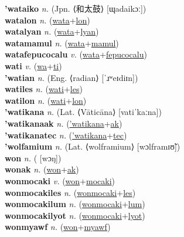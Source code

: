 \textbf{'wataiko} \textit{n.} (Jpn. ⟨和太鼓⟩ [ɰadaikɔː])
 \label{'wataiko} \\
\textbf{watalon} \textit{n.} (\hyperref[wata]{wata}+\hyperref[lon]{lon})
 \label{watalon} \\
\textbf{watalyan} \textit{n.} (\hyperref[wata]{wata}+\hyperref[lyan]{lyan})
 \label{watalyan} \\
\textbf{watamamul} \textit{n.} (\hyperref[wata]{wata}+\hyperref[mamul]{mamul})
 \label{watamamul} \\
\textbf{watafepucocalu} \textit{v.} (\hyperref[wata]{wata}+\hyperref[fepucocalu]{fepucocalu})
 \label{watafepucocalu} \\
\textbf{wati} \textit{v.} (\hyperref[wa]{wa}+\hyperref[ti]{ti})
 \label{wati} \\
\textbf{'watian} \textit{n.} (Eng. ⟨radian⟩ [ˈɹʷeɪdiɪn])
 \label{'watian} \\
\textbf{watiles} \textit{n.} (\hyperref[wati]{wati}+\hyperref[les]{les})
 \label{watiles} \\
\textbf{watilon} \textit{n.} (\hyperref[wati]{wati}+\hyperref[lon]{lon})
 \label{watilon} \\
\textbf{'watikana} \textit{n.} (Lat. ⟨Vāticāna⟩ [vatiˈkaːna])
 \label{'watikana} \\
\textbf{'watikanaak} \textit{n.} (\hyperref['watikana]{'watikana}+\hyperref[ak]{ak})
 \label{'watikanaak} \\
\textbf{'watikanatec} \textit{n.} (\hyperref['watikana]{'watikana}+\hyperref[tec]{tec})
 \label{'watikanatec} \\
\textbf{'wolfamium} \textit{n.} (Lat. ⟨wolframium⟩ [wɔlframɪʊ̃])
 \label{'wolfamium} \\
\textbf{won} \textit{n.} ( [wɔŋ])
 \label{won} \\
\textbf{wonak} \textit{n.} (\hyperref[won]{won}+\hyperref[ak]{ak})
 \label{wonak} \\
\textbf{wonmocaki} \textit{v.} (\hyperref[won]{won}+\hyperref[mocaki]{mocaki})
 \label{wonmocaki} \\
\textbf{wonmocakiles} \textit{n.} (\hyperref[wonmocaki]{wonmocaki}+\hyperref[les]{les})
 \label{wonmocakiles} \\
\textbf{wonmocakilum} \textit{n.} (\hyperref[wonmocaki]{wonmocaki}+\hyperref[lum]{lum})
 \label{wonmocakilum} \\
\textbf{wonmocakilyot} \textit{n.} (\hyperref[wonmocaki]{wonmocaki}+\hyperref[lyot]{lyot})
 \label{wonmocakilyot} \\
\textbf{wonmyawf} \textit{n.} (\hyperref[won]{won}+\hyperref[myawf]{myawf})
